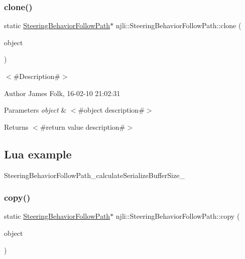 \subsubsection{\texorpdfstring{clone()}{clone()}}
{\footnotesize\ttfamily static \mbox{\hyperlink{classnjli_1_1_steering_behavior_follow_path}{Steering\+Behavior\+Follow\+Path}}$\ast$ njli\+::\+Steering\+Behavior\+Follow\+Path\+::clone (\begin{DoxyParamCaption}\item[{const \mbox{\hyperlink{classnjli_1_1_steering_behavior_follow_path}{Steering\+Behavior\+Follow\+Path}} \&}]{object }\end{DoxyParamCaption})\hspace{0.3cm}{\ttfamily [static]}}



$<$\#\+Description\#$>$ 

\begin{DoxyAuthor}{Author}
James Folk, 16-\/02-\/10 21\+:02\+:31
\end{DoxyAuthor}

\begin{DoxyParams}{Parameters}
{\em object} & $<$\#object description\#$>$\\
\hline
\end{DoxyParams}
\begin{DoxyReturn}{Returns}
$<$\#return value description\#$>$
\end{DoxyReturn}
\hypertarget{classnjli_1_1_steering_behavior_wander_ex1}{}\subsection{Lua example}\label{classnjli_1_1_steering_behavior_wander_ex1}

\begin{DoxyCodeInclude}
\end{DoxyCodeInclude}
Steering\+Behavior\+Follow\+Path\+\_\+calculate\+Serialize\+Buffer\+Size\+\_\+ \mbox{\label{classnjli_1_1_steering_behavior_follow_path_a7043e83acc2cb2c60764482381b6fc80}} 
\subsubsection{\texorpdfstring{copy()}{copy()}}
{\footnotesize\ttfamily static \mbox{\hyperlink{classnjli_1_1_steering_behavior_follow_path}{Steering\+Behavior\+Follow\+Path}}$\ast$ njli\+::\+Steering\+Behavior\+Follow\+Path\+::copy (\begin{DoxyParamCaption}\item[{const \mbox{\hyperlink{classnjli_1_1_steering_behavior_follow_path}{Steering\+Behavior\+Follow\+Path}} \&}]{object }\end{DoxyParamCaption})\hspace{0.3cm}{\ttfamily [static]}}



